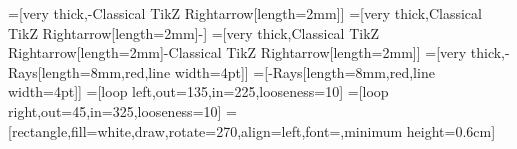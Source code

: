 \newcommand{\ojoin}{\setbox0=\hbox{$\bowtie$}%
    \rule[-.02ex]{.25em}{.4pt}\llap{\rule[\ht0]{.25em}{.4pt}}}
\newcommand{\louterjoin}{\mathbin{\ojoin\mkern-5.8mu\bowtie}}
\newcommand{\routerjoin}{\mathbin{\bowtie\mkern-5.8mu\ojoin}}
\newcommand{\fouterjoin}{\mathbin{\ojoin\mkern-5.8mu\bowtie\mkern-5.8mu\ojoin}}
\newcommand{\ra}[1]{\mathrm{#1}}
\newcommand{\raop}[1]{\mathord{\mbox{\larger[1]$#1$}}}   %
\newcommand{\rabin}[1]{\mathbin{\mbox{\larger[1]$#1$}}}  %
\newcommand{\lit}[1]{\text{\textsf{"#1"}}}

\usetikzlibrary{arrows.meta}
\usetikzlibrary{shapes.multipart}
\usetikzlibrary{shapes.callouts}
\usetikzlibrary{decorations.pathreplacing} %
\usetikzlibrary{fit} %
\usetikzlibrary{shapes.geometric} %
\usetikzlibrary{overlay-beamer-styles} %
=[very thick,-{Classical TikZ Rightarrow[length=2mm]}]
=[very thick,{Classical TikZ Rightarrow[length=2mm]}-]
=[very thick,{Classical TikZ Rightarrow[length=2mm]}-{Classical TikZ Rightarrow[length=2mm]}]
=[very thick,-{Rays[length=8mm,red,line width=4pt]}]
=[-{Rays[length=8mm,red,line width=4pt]}]
=[loop left,out=135,in=225,looseness=10]
=[loop right,out=45,in=325,looseness=10]
=[rectangle,fill=white,draw,rotate=270,align=left,font=\footnotesize,minimum height=0.6cm]


